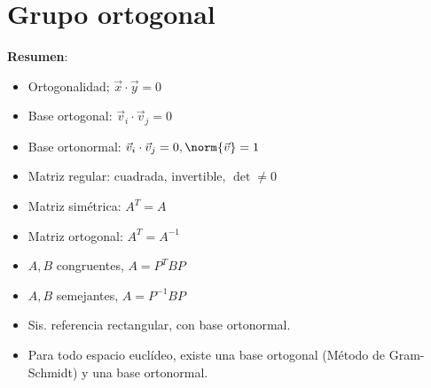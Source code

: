 \documentclass{./Geometria.tex}
\begin{document}
\chapter{Grupo ortogonal}
\textbf{Resumen}:
\begin{itemize}
    \item Ortogonalidad; \(\vec{x} \cdot \vec{y} = 0\)
    \item Base ortogonal: \(\vec{v}_i \cdot \vec{v}_j = 0\)
    \item Base ortonormal: \(\vec{v}_i \cdot \vec{v}_j = 0, \norm{\vec{v}} = 1\)
    \item Matriz regular: cuadrada, invertible, \(\det \neq 0\)
    \item Matriz simétrica: \(A^{T} = A\)
    \item Matriz ortogonal: \(A^{T} = A^{-1}\)
    \item \(A,B\) congruentes, \(A = P^{T}BP\)
    \item \(A,B\) semejantes, \(A = P^{-1}BP\)
    \item Sis. referencia rectangular, con base ortonormal.
    \item Para todo espacio euclídeo, existe una base ortogonal (Método de Gram-Schmidt) y una base ortonormal.
\end{itemize}
\end{document}
